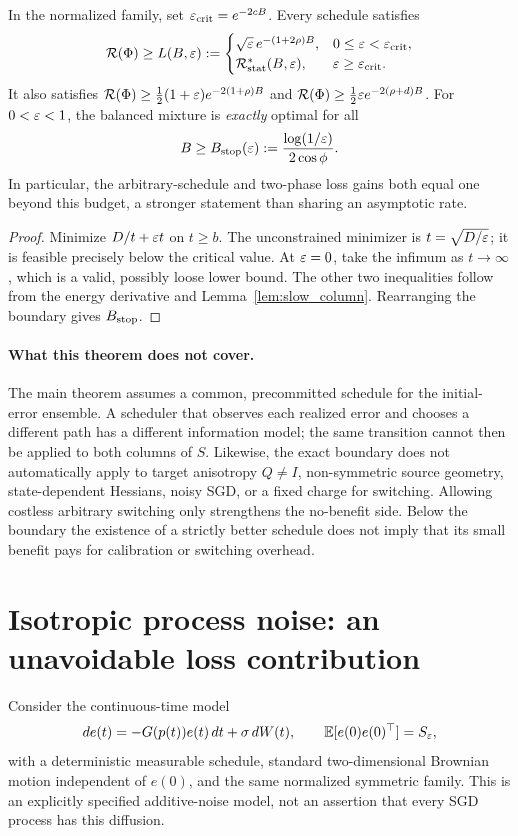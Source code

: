 \begin{corollary}\label{cor:global_envelope}
In the normalized family, set $\varepsilon_{\rm crit}=e^{-2cB}$. Every schedule satisfies
\[
 \mathcal R(\Phi)\ge L(B,\varepsilon):=
 \begin{cases}
 \sqrt{\varepsilon}\,e^{-(1+2\rho)B},&0\le\varepsilon<\varepsilon_{\rm crit},\\
 \mathcal R_{\mathrm{stat}}^*(B,\varepsilon),&\varepsilon\ge\varepsilon_{\rm crit}.
 \end{cases}
\]
It also satisfies $\mathcal R(\Phi)\ge\frac12(1+\varepsilon)e^{-2(1+\rho)B}$ and $\mathcal R(\Phi)\ge\frac12\varepsilon e^{-2(\rho+d)B}$. For $0<\varepsilon<1$, the balanced mixture is \emph{exactly} optimal for all
\[
 B\ge B_{\rm stop}(\varepsilon):=\frac{\log(1/\varepsilon)}{2\cos\phi}.
\]
In particular, the arbitrary-schedule and two-phase loss gains both equal one beyond this budget, a stronger statement than sharing an asymptotic rate.
\end{corollary}
\begin{proof}
Minimize $D/t+\varepsilon t$ on $t\ge b$. The unconstrained minimizer is $t=\sqrt{D/\varepsilon}$; it is feasible precisely below the critical value. At $\varepsilon=0$, take the infimum as $t\to\infty$, which is a valid, possibly loose lower bound. The other two inequalities follow from the energy derivative and Lemma~\ref{lem:slow_column}. Rearranging the boundary gives $B_{\rm stop}$.
\end{proof}

\paragraph{What this theorem does not cover.}
The main theorem assumes a common, precommitted schedule for the initial-error ensemble. A scheduler that observes each realized error and chooses a different path has a different information model; the same transition cannot then be applied to both columns of $S$. Likewise, the exact boundary does not automatically apply to target anisotropy $Q\ne I$, non-symmetric source geometry, state-dependent Hessians, noisy SGD, or a fixed charge for switching. Allowing costless arbitrary switching only strengthens the no-benefit side. Below the boundary the existence of a strictly better schedule does not imply that its small benefit pays for calibration or switching overhead.

\section{Isotropic process noise: an unavoidable loss contribution}\label{app:diffusion}
Consider the continuous-time model
\[
 de(t)=-G(p(t))e(t)\,dt+\sigma\,dW(t),
 \qquad \mathbb E[e(0)e(0)^\top]=S_\varepsilon,
\]
with a deterministic measurable schedule, standard two-dimensional Brownian motion independent of $e(0)$, and the same normalized symmetric family. This is an explicitly specified additive-noise model, not an assertion that every SGD process has this diffusion.

